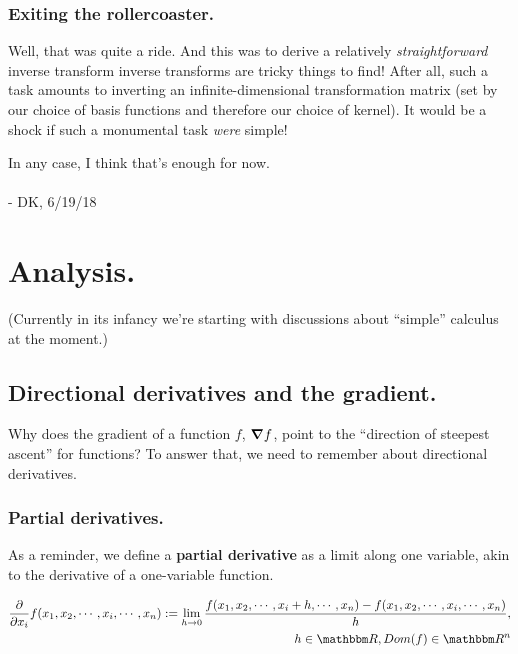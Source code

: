 \documentclass[letterpaper,12pt]{report}
\begin{document}
\subsection{Exiting the rollercoaster.}
Well, that was quite a ride.
And this was to derive a relatively \emph{straightforward}
inverse transform \textemdash{}
inverse transforms are tricky things
to find! After all, such a task amounts to inverting
an infinite-dimensional transformation matrix
(set by our choice of basis functions and therefore our choice
of kernel).
It would be a shock if such a 
monumental task \emph{were} simple!\par

In any case, I think that's enough for now.
\\
\\
- DK, 6/19/18

\newpage

\chapter{Analysis.}\label{chapter:analysis}

(Currently in its infancy \textemdash{} we're starting
with discussions about ``simple'' calculus at the moment.)

\section{Directional derivatives and the gradient.}

Why does the gradient of a function \(f\), \(\grad{f}\),
point to the ``direction of steepest ascent'' for functions?
To answer that, we need to remember 
about directional derivatives.

\subsection{Partial derivatives.}

As a reminder, we define a 
\textbf{partial derivative}
as a limit along one variable, akin to the derivative
of a one-variable function.

\[\begin{split}
  \pdv{}{x_i}f(x_1, x_2, \cdots, x_i, \cdots, x_n) \definedas \lim_{h \rightarrow 0} \frac{f(x_1, x_2, \cdots, x_i + h, \cdots, x_n) - f(x_1, x_2, \cdots, x_i, \cdots, x_n)}{h}, 
  \\
  h \in \domain{R}, Dom(f) \in \domain{R}^n
\end{split}\]
\end{document}
